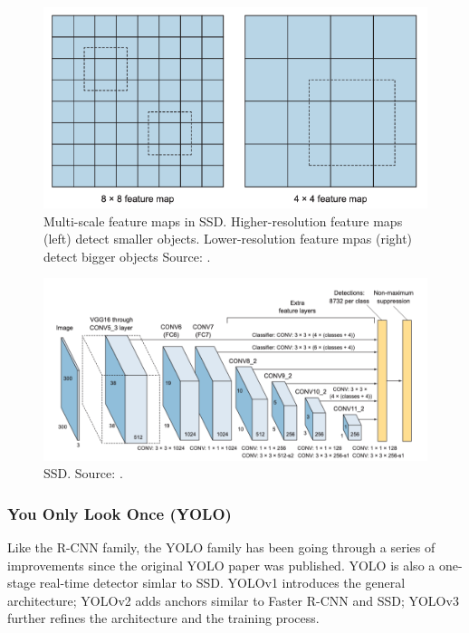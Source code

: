 \documentclass[a4paper, 11pt, oneside]{article}
\begin{document}
  \begin{figure}[ht]
    \begin{center}
      \includegraphics[width=.8\textwidth]{ssd_feature_maps.png}
    \end{center}
    \caption{Multi-scale feature maps in SSD. Higher-resolution feature maps (left) detect smaller objects.
    Lower-resolution feature mpas (right) detect bigger objects Source: \cite{elgendy2020deep}.}
  \end{figure}

  \begin{figure}[ht]
    \begin{center}
      \includegraphics[width=.8\textwidth]{ssd.png}
    \end{center}
    \caption{SSD. Source: \cite{elgendy2020deep}.}
  \end{figure}

  \subsubsection{You Only Look Once (YOLO)}

  Like the R-CNN family, the YOLO family has been going through a series of improvements since the original YOLO paper
  was published. YOLO is also a one-stage real-time detector simlar to SSD. YOLOv1 \cite{redmon2016you} introduces the
  general architecture; YOLOv2 \cite{redmon2017yolo9000} adds anchors similar to Faster R-CNN and SSD; YOLOv3
  \cite{redmon2018yolov3} further refines the architecture and the training process.
\end{document}
